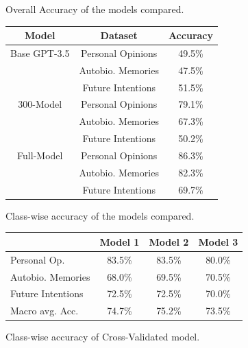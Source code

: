 \documentclass[10pt,twocolumn,letterpaper]{article}
\begin{document}
\begin{center}
\small {Overall Accuracy of the models compared.}
\end{center}

\begin{center}

    \begin{tabular}{ccc}
        \toprule
        Model & Dataset & Accuracy \\
        \midrule
        Base GPT-3.5 & Personal Opinions & 49.5\% \\
                        & Autobio. Memories & 47.5\% \\
                        & Future Intentions & 51.5\% \\
        \midrule
        300-Model & Personal Opinions & 79.1\% \\
                    & Autobio. Memories & 67.3\% \\
                    & Future Intentions & 50.2\% \\
        \midrule
        Full-Model & Personal Opinions & 86.3\% \\
                    & Autobio. Memories & 82.3\% \\
                    & Future Intentions & 69.7\% \\
        \bottomrule
    \end{tabular} 
\end{center}


\begin{center}
    \small {Class-wise accuracy of the models compared.}
\end{center}

\begin{center}
    \begin{tabular}{lccc}
      \toprule
      & Model 1 & Model 2 & Model 3 \\
      \midrule
      Personal Op. & 83.5\% & 83.5\% & 80.0\% \\
      Autobio. Memories & 68.0\% & 69.5\% & 70.5\% \\
      Future Intentions & 72.5\% & 72.5\% & 70.0\% \\
      \midrule
      Macro avg. Acc. & 74.7\% & 75.2\% & 73.5\% \\
      \bottomrule
    \end{tabular}
\end{center}

\begin{center}
    \small {Class-wise accuracy of Cross-Validated model.}
\end{center}
\end{document}
